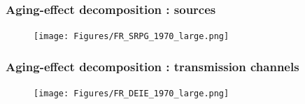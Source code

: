 \documentclass{beamer}
\begin{document}
			\begin{frame}\frametitle{Aging-effect decomposition : sources}
				\begin{figure}[h]
					\centering
					\begin{overlayarea}{\textwidth}{\textheight}
						\texttt{[image: Figures/FR\_SRPG\_1970\_large.png]}
						\label{fig:FR_SRPG_decomp_1970}
					\end{overlayarea}
				\end{figure}
			\end{frame}
			\begin{frame}\frametitle{Aging-effect decomposition : transmission channels}
				\begin{figure}[h]
					\centering
					\begin{overlayarea}{\textwidth}{\textheight}
						\texttt{[image: Figures/FR\_DEIE\_1970\_large.png]}
						\label{fig:FR_DEIE_decomp_1970}
					\end{overlayarea}
				\end{figure}
			\end{frame}
\end{document}
